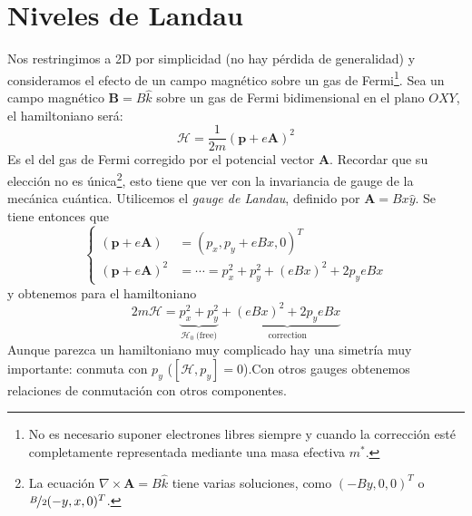 \section{Niveles de Landau}
Nos restringimos a 2D por simplicidad (no hay pérdida de generalidad)
y consideramos el efecto de un campo magnético sobre un gas de
Fermi\footnote{No es necesario suponer electrones libres siempre y
  cuando la corrección esté completamente representada mediante una
  masa efectiva $m^*$.}. Sea un campo magnético $\mathbf{B} = B
\hat{k}$ sobre un gas de Fermi bidimensional en el plano $OXY$, el
hamiltoniano será:
\begin{equation}
  \mathcal{H} = \frac{1}{2m}(\mathbf{p} + e \mathbf{A})^2
\end{equation}
Es el del gas de Fermi corregido por el potencial vector
$\mathbf{A}$. Recordar que su elección no es única\footnote{La
  ecuación $\nabla \times \mathbf{A} = B \hat{k}$ tiene varias
  soluciones, como $(-By,0,0)^T$ o $\nicefrac{B}{2}(-y,x,0)^T$.}, esto tiene que ver
con la invariancia de gauge de la mecánica cuántica. Utilicemos el
\emph{gauge de Landau}, definido por $\mathbf{A} = Bx \hat{y}$. Se
tiene entonces que
\begin{equation}
  \begin{cases}
    (\mathbf{p}+e \mathbf{A}) &= (p_x,p_y + eBx,0)^T \\
    (\mathbf{p}+e \mathbf{A})^2 &= \cdots = p_x^2 + p_y^2 + (eBx)^2 +
    2p_y e Bx 
  \end{cases}
\end{equation}
y obtenemos para el hamiltoniano
\begin{equation}
  2m\mathcal{H} = 
    \underbrace{ p_x^2 + p_y^2}_{\mathcal{H}_0 \ \text{(free)}} +  \underbrace{(eBx)^2 +
    2p_y e Bx}_{\text{correction}}
\end{equation}
Aunque parezca un hamiltoniano muy complicado hay una simetría muy
importante: conmuta con $p_y$ ($[\mathcal{H},p_y] =0$).Con otros
gauges obtenemos relaciones de conmutación con otros
componentes.

